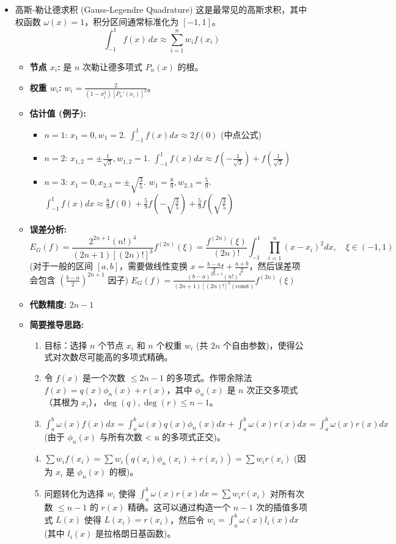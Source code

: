 \begin{itemize}
	\item 高斯-勒让德求积 (Gauss-Legendre Quadrature)
这是最常见的高斯求积，其中权函数 $\omega(x)=1$，积分区间通常标准化为 $[-1, 1]$。
\[
\int_{-1}^1 f(x) \, dx \approx \sum_{i=1}^n w_i f(x_i)
\]	\begin{itemize}
		\item \textbf{节点 $x_i$:} 是 $n$ 次勒让德多项式 $P_n(x)$ 的根。
		\item \textbf{权重 $w_i$:} $w_i = \frac{2}{(1-x_i^2)[P_n'(x_i)]^2}$。
		\item \textbf{估计值 (例子):}
		\begin{itemize}
			\item $n=1$: $x_1=0, w_1=2$. $\int_{-1}^1 f(x)dx \approx 2f(0)$ (中点公式)
			\item $n=2$: $x_{1,2}=\pm \frac{1}{\sqrt{3}}, w_{1,2}=1$. $\int_{-1}^1 f(x)dx \approx f(-\frac{1}{\sqrt{3}}) + f(\frac{1}{\sqrt{3}})$
			\item $n=3$: $x_1=0, x_{2,3}=\pm\sqrt{\frac{3}{5}}$. $w_1=\frac{8}{9}, w_{2,3}=\frac{5}{9}$. $\int_{-1}^1 f(x)dx \approx \frac{8}{9}f(0) + \frac{5}{9}f(-\sqrt{\frac{3}{5}}) + \frac{5}{9}f(\sqrt{\frac{3}{5}})$
		\end{itemize}
		\item \textbf{误差分析:}
\[
E_G(f) = \frac{2^{2n+1}(n!)^4}{(2n+1)[(2n)!]^3} f^{(2n)}(\xi) = \frac{f^{(2n)}(\xi)}{(2n)!} \int_{-1}^1 \prod_{i=1}^n (x-x_i)^2 dx, \quad \xi \in (-1,1)
\](对于一般的区间 $[a,b]$，需要做线性变换 $x = \frac{b-a}{2}t + \frac{a+b}{2}$，然后误差项会包含 $(\frac{b-a}{2})^{2n+1}$ 因子)
$E_G(f) = \frac{(b-a)^{2n+1}(n!)^4}{(2n+1)[(2n)!]^3 (\text{const})} f^{(2n)}(\xi)$
		\item \textbf{代数精度:} $2n-1$
		\item \textbf{简要推导思路:}
		\begin{enumerate}
			\item 目标：选择 $n$ 个节点 $x_i$ 和 $n$ 个权重 $w_i$ (共 $2n$ 个自由参数)，使得公式对次数尽可能高的多项式精确。
			\item 令 $f(x)$ 是一个次数 $\le 2n-1$ 的多项式。作带余除法 $f(x) = q(x) \phi_n(x) + r(x)$，其中 $\phi_n(x)$ 是 $n$ 次正交多项式（其根为 $x_i$），$\deg(q), \deg(r) \le n-1$。
			\item $\int_a^b \omega(x)f(x)dx = \int_a^b \omega(x)q(x)\phi_n(x)dx + \int_a^b \omega(x)r(x)dx = \int_a^b \omega(x)r(x)dx$ (由于 $\phi_n(x)$ 与所有次数 < n 的多项式正交)。
			\item $\sum w_i f(x_i) = \sum w_i (q(x_i)\phi_n(x_i) + r(x_i)) = \sum w_i r(x_i)$ (因为 $x_i$ 是 $\phi_n(x)$ 的根)。
			\item 问题转化为选择 $w_i$ 使得 $\int_a^b \omega(x)r(x)dx = \sum w_i r(x_i)$ 对所有次数 $\le n-1$ 的 $r(x)$ 精确。这可以通过构造一个 $n-1$ 次的插值多项式 $L(x)$ 使得 $L(x_i)=r(x_i)$，然后令 $w_i = \int_a^b \omega(x) l_i(x) dx$ (其中 $l_i(x)$ 是拉格朗日基函数)。
		\end{enumerate}
	\end{itemize}
\end{itemize}


